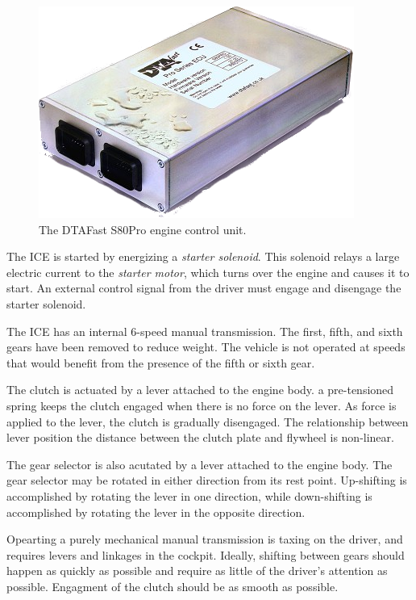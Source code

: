 \begin{figure}[H]
	\centering
	 	\includegraphics[scale=0.5]{figures/s80.png}
    \caption{The DTAFast S80Pro engine control unit.}
    \label{fig:s80pro_product}
\end{figure}

The ICE is started by energizing a \emph{starter solenoid}. This solenoid relays a large electric current to the \emph{starter motor}, which turns over the engine and causes it to start. An external control signal from the driver must engage and disengage the starter solenoid.

The ICE has an internal 6-speed manual transmission. The first, fifth, and sixth gears have been removed to reduce weight. The vehicle is not operated at speeds that would benefit from the presence of the fifth or sixth gear.

The clutch is actuated by a lever attached to the engine body. a pre-tensioned spring keeps the clutch engaged when there is no force on the lever. As force is applied to the lever, the clutch is gradually disengaged. The relationship between lever position the distance between the clutch plate and flywheel is non-linear. 

The gear selector is also acutated by a lever attached to the engine body. The gear selector may be rotated in either direction from its rest point. Up-shifting is accomplished by rotating the lever in one direction, while down-shifting is accomplished by rotating the lever in the opposite direction. 

Opearting a purely mechanical manual transmission is taxing on the driver, and requires levers and linkages in the cockpit. Ideally, shifting between gears should happen as quickly as possible and require as little of the driver's attention as possible. Engagment of the clutch should be as smooth as possible. 

